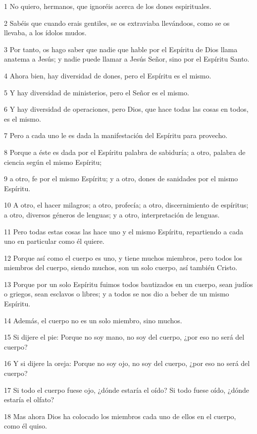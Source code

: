\par 1 No quiero, hermanos, que ignoréis acerca de los dones espirituales.
\par 2 Sabéis que cuando erais gentiles, se os extraviaba llevándoos, como se os llevaba, a los ídolos mudos.
\par 3 Por tanto, os hago saber que nadie que hable por el Espíritu de Dios llama anatema a Jesús; y nadie puede llamar a Jesús Señor, sino por el Espíritu Santo.
\par 4 Ahora bien, hay diversidad de dones, pero el Espíritu es el mismo.
\par 5 Y hay diversidad de ministerios, pero el Señor es el mismo.
\par 6 Y hay diversidad de operaciones, pero Dios, que hace todas las cosas en todos, es el mismo.
\par 7 Pero a cada uno le es dada la manifestación del Espíritu para provecho.
\par 8 Porque a éste es dada por el Espíritu palabra de sabiduría; a otro, palabra de ciencia según el mismo Espíritu;
\par 9 a otro, fe por el mismo Espíritu; y a otro, dones de sanidades por el mismo Espíritu.
\par 10 A otro, el hacer milagros; a otro, profecía; a otro, discernimiento de espíritus; a otro, diversos géneros de lenguas; y a otro, interpretación de lenguas.
\par 11 Pero todas estas cosas las hace uno y el mismo Espíritu, repartiendo a cada uno en particular como él quiere.
\par 12 Porque así como el cuerpo es uno, y tiene muchos miembros, pero todos los miembros del cuerpo, siendo muchos, son un solo cuerpo, así también Cristo.
\par 13 Porque por un solo Espíritu fuimos todos bautizados en un cuerpo, sean judíos o griegos, sean esclavos o libres; y a todos se nos dio a beber de un mismo Espíritu.
\par 14 Además, el cuerpo no es un solo miembro, sino muchos.
\par 15 Si dijere el pie: Porque no soy mano, no soy del cuerpo, ¿por eso no será del cuerpo?
\par 16 Y si dijere la oreja: Porque no soy ojo, no soy del cuerpo, ¿por eso no será del cuerpo?
\par 17 Si todo el cuerpo fuese ojo, ¿dónde estaría el oído? Si todo fuese oído, ¿dónde estaría el olfato?
\par 18 Mas ahora Dios ha colocado los miembros cada uno de ellos en el cuerpo, como él quiso.
